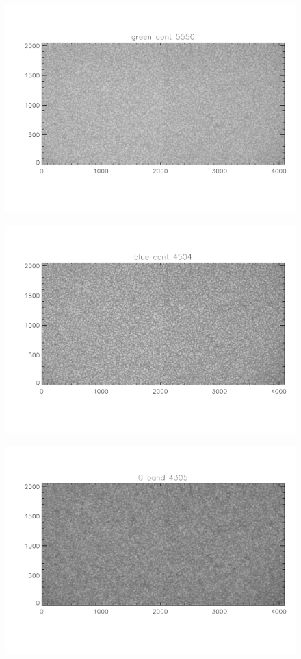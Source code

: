 \documentclass[a4paper,10pt]{report}
\begin{document}
\begin{figure}[H]
\includegraphics[width=\linewidth]{file1.pdf}
\end{figure}

\begin{figure}[H]
\includegraphics[width=\linewidth]{file2.pdf}
\end{figure}

\begin{figure}[H]
\includegraphics[width=\linewidth]{file3.pdf}
\end{figure}
\end{document}
